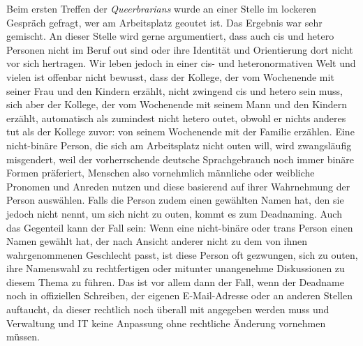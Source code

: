 \documentclass[a4paper,
fontsize=11pt,
oneside,
numbers=noperiodatend,
parskip=half-,
bibliography=totoc,
final
]{scrartcl}
\begin{document}
Beim ersten Treffen der \emph{Queerbrarians} wurde an einer Stelle im
lockeren Gespräch gefragt, wer am Arbeitsplatz geoutet ist. Das Ergebnis
war sehr gemischt. An dieser Stelle wird gerne argumentiert, dass auch
cis und hetero Personen nicht im Beruf out sind oder ihre Identität und
Orientierung dort nicht vor sich hertragen. Wir leben jedoch in einer
cis- und heteronormativen Welt und vielen ist offenbar nicht bewusst,
dass der Kollege, der vom Wochenende mit seiner Frau und den Kindern
erzählt, nicht zwingend cis und hetero sein muss, sich aber der Kollege,
der vom Wochenende mit seinem Mann und den Kindern erzählt, automatisch
als zumindest nicht hetero outet, obwohl er nichts anderes tut als der
Kollege zuvor: von seinem Wochenende mit der Familie erzählen. Eine
nicht-binäre Person, die sich am Arbeitsplatz nicht outen will, wird
zwangsläufig misgendert, weil der vorherrschende deutsche Sprachgebrauch
noch immer binäre Formen präferiert, Menschen also vornehmlich männliche
oder weibliche Pronomen und Anreden nutzen und diese basierend auf ihrer
Wahrnehmung der Person auswählen. Falls die Person zudem einen gewählten
Namen hat, den sie jedoch nicht nennt, um sich nicht zu outen, kommt es
zum Deadnaming. Auch das Gegenteil kann der Fall sein: Wenn eine
nicht-binäre oder trans Person einen Namen gewählt hat, der nach Ansicht
anderer nicht zu dem von ihnen wahrgenommenen Geschlecht passt, ist
diese Person oft gezwungen, sich zu outen, ihre Namenswahl zu
rechtfertigen oder mitunter unangenehme Diskussionen zu diesem Thema zu
führen. Das ist vor allem dann der Fall, wenn der Deadname noch in
offiziellen Schreiben, der eigenen E-Mail-Adresse oder an anderen
Stellen auftaucht, da dieser rechtlich noch überall mit angegeben werden
muss und Verwaltung und IT keine Anpassung ohne rechtliche Änderung
vornehmen müssen.
\end{document}
